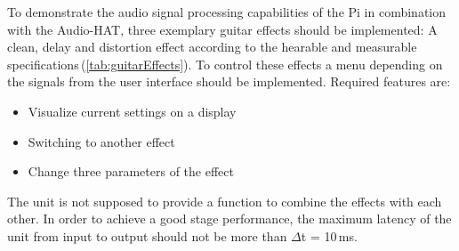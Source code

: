 To demonstrate the audio signal processing capabilities of the Pi in combination with the Audio-HAT, three exemplary guitar effects should be implemented:
A clean, delay and distortion effect according to the hearable and measurable specifications\,(\ref{tab:guitarEffects}).
To control these effects a menu depending on the signals from the user interface should be implemented.
Required features are:

\begin{center} 
   \begin{varwidth}{4in} 
      \begin{itemize} 
      	 \item Visualize current settings on a display 
         \item Switching to another effect
         \item Change three parameters of the effect
      \end{itemize} 
   \end{varwidth} 
\end{center} 

The unit is not supposed to provide a function to combine the effects with each other.
In order to achieve a good stage performance, the maximum latency of the unit from input to output should not be more than $\Delta$t = 10\,ms.
